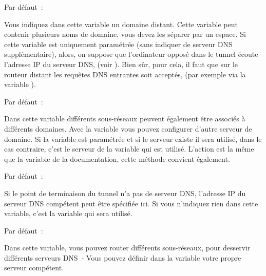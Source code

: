 \begin{description}


  Par défaut~: 

  Vous indiquez dans cette variable un domaine distant. Cette variable peut
  contenir plusieurs noms de domaine, vous devez les séparer par un espace.
  Si cette variable est uniquement paramétrée (sans indiquer de serveur DNS
  supplémentaire), alors, on suppose que l'ordinateur opposé dans le tunnel
  écoute l'adresse IP du serveur DNS,
  (voir ).
  Bien sûr, pour cela, il faut que sur le routeur distant les requêtes DNS
  entrantes soit acceptés, (par exemple via la variable ).


  Par défaut~: 

  Dans cette variable différents sous-réseaux peuvent également être associés
  à différents domaines. Avec la variable  vous pouvez
  configurer d'autre serveur de domaine. Si la variable
  est paramétrée et si le serveur existe il sera utilisé, dans le cas contraire,
  c'est le serveur de la variable  qui est utilisé. L'action
  est la même que la variable  de la documentation, cette
  méthode convient également.


  Par défaut~: 

  Si le point de terminaison du tunnel n'a pas de serveur DNS, l'adresse IP du
  serveur DNS compétent peut être spécifiée ici. Si vous n'indiquez rien dans
  cette variable, c'est la variable 
  qui sera utilisé.


  Par défaut~: 

  Dans cette variable, vous pouvez router différents sous-réseaux, pour
  desservir différents serveurs DNS~- Vous pouvez définir dans la variable
   votre propre serveur compétent.

\end{description}


